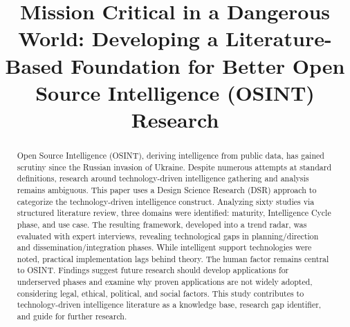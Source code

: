 \documentclass[10pt]{article}
\title{Mission Critical in a Dangerous World: Developing a Literature-Based Foundation for Better Open Source Intelligence (OSINT) Research}
\date{}
\begin{document}
\maketitle
\begin{abstract}
    Open Source Intelligence (OSINT), deriving intelligence from public data, has gained scrutiny since the Russian invasion of Ukraine. Despite numerous attempts at standard definitions, research around technology-driven intelligence gathering and analysis remains ambiguous. This paper uses a Design Science Research (DSR) approach to categorize the technology-driven intelligence construct. Analyzing sixty studies via structured literature review, three domains were identified: maturity, Intelligence Cycle phase, and use case. The resulting framework, developed into a trend radar, was evaluated with expert interviews, revealing technological gaps in planning/direction and dissemination/integration phases. While intelligent support technologies were noted, practical implementation lags behind theory. The human factor remains central to OSINT. Findings suggest future research should develop applications for underserved phases and examine why proven applications are not widely adopted, considering legal, ethical, political, and social factors. This study contributes to technology-driven intelligence literature as a knowledge base, research gap identifier, and guide for further research.
\end{abstract}
\end{document}
